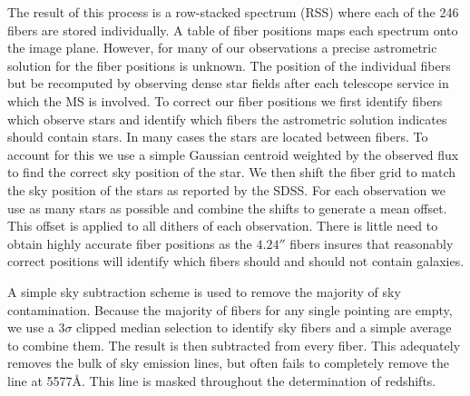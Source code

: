The result of this process is a row-stacked spectrum (RSS) where each of the 246 fibers are stored individually. A table of fiber positions maps each spectrum onto the image plane. However, for many of our observations a precise astrometric solution for the fiber positions is unknown. The position of the individual fibers but be recomputed by observing dense star fields after each telescope service in which the MS is involved. To correct our fiber positions we first identify fibers which observe stars and identify which fibers the astrometric solution indicates should contain stars. In many cases the stars are located between fibers. To account for this we use a simple Gaussian centroid weighted by the observed flux  to find the correct sky position of the star. We then shift the fiber grid to match the sky position of the stars as reported by the SDSS. For each observation we use as many stars as possible and combine the shifts to generate a mean offset. This offset is applied to all dithers of each observation. There is little need to obtain highly accurate fiber positions as the $4.24''$ fibers insures that reasonably correct positions will identify which fibers should and should not contain galaxies.

A simple sky subtraction scheme is used to remove the majority of sky contamination. Because the majority of fibers for any single pointing are empty, we use a $3\sigma$ clipped median selection to identify sky fibers and a simple average to combine them. The result is then subtracted from every fiber. This adequately removes the bulk of sky emission lines, but often fails to completely remove the  line at 5577\AA. This line is masked throughout the determination of redshifts.


